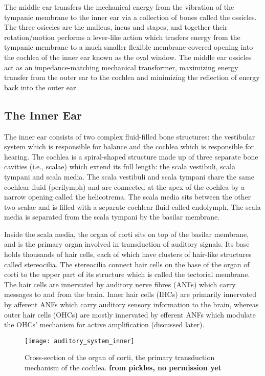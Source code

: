 The middle ear transfers the mechanical energy from the vibration of the tympanic membrane to the inner ear via a collection of bones called the ossicles. The three osiccles are the malleus, incus and stapes, and together their rotation/motion performs a lever-like action which trasfers energy from the tympanic membrane to a much smaller flexible membrane-covered opening into the cochlea of the inner ear known as the oval window. The middle ear ossicles act as an impedance-matching mechanical transformer, maximizing energy transfer from the outer ear to the cochlea and minimizing the reflection of energy back into the outer ear.

\subsection{The Inner Ear}

The inner ear consists of two complex fluid-filled bone structures: the vestibular system which is responsible for balance and the cochlea which is responsible for hearing. The cochlea is a spiral-shaped structure made up of three separate bone cavities (i.e., scalae) which extend its full length: the scala vestibuli, scala tympani and scala media. The scala vestibuli and scala tympani share the same cochlear fluid (perilymph) and are connected at the apex of the cochlea by a narrow opening called the helicotrema. The scala media sits between the other two scalae and is filled with a separate cochlear fluid called endolymph. The scala media is separated from the scala tympani by the basilar membrane. 

Inside the scala media, the organ of corti sits on top of the basilar membrane, and is the primary organ involved in transduction of auditory signals. Its base holds thousands of hair cells, each of which have clusters of hair-like structures called stereocilia. The stereocilia connect hair cells on the base of the organ of corti to the upper part of its structure which is called the tectorial membrane. The hair cells are innervated by auditory nerve fibres (ANFs) which carry messages to and from the brain. Inner hair cells (IHCs) are primarily innervated by afferent ANFs which carry auditory sensory information to the brain, whereas outer hair cells (OHCs) are mostly innervated by efferent ANFs which modulate the OHCs' mechanism for active amplification (discussed later).

\begin{figure}[H]
	\centering
	\texttt{[image: auditory\_system\_inner]}
	\caption[Cross-section of the organ of corti]{Cross-section of the organ of corti, the primary transduction mechanism of the cochlea. \textbf{from pickles, no permission yet}}
	\label{fig:auditory_system_inner}
\end{figure}

